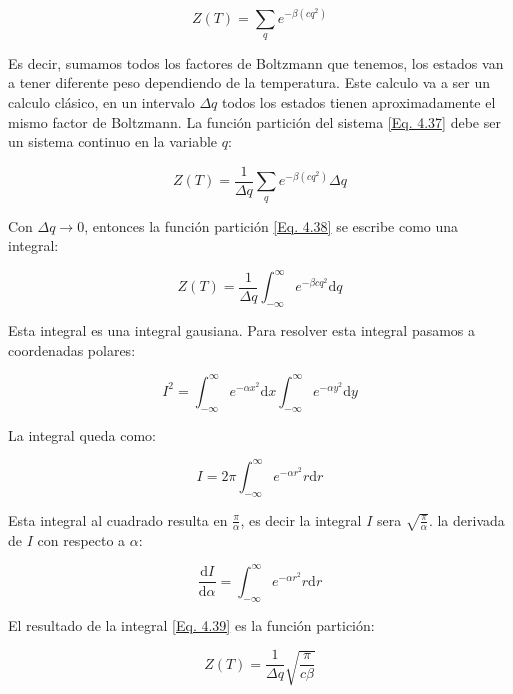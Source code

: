 \documentclass[11pt,fleqn]{book}
\begin{document}
\begin{equation}
    Z(T)=\sum_{q}e^{-\beta(cq^{2})}
    \label{Eq. 4.37}
\end{equation}

Es decir, sumamos todos los factores de Boltzmann que tenemos, los estados van a tener diferente peso dependiendo de la temperatura. Este calculo va a ser un calculo clásico, en un intervalo $\Delta q$ todos los estados tienen aproximadamente el mismo factor de Boltzmann. La función partición del sistema \ref{Eq. 4.37} debe ser un sistema continuo en la variable $q$:

\begin{equation}
    Z(T)=\frac{1}{\Delta q}\sum_{q}e^{-\beta(cq^{2})}\Delta q
    \label{Eq. 4.38}
\end{equation}

Con $\Delta q\longrightarrow0$, entonces la función partición \ref{Eq. 4.38} se escribe como una integral:

\begin{equation}
    Z(T)=\frac{1}{\Delta q}\int_{-\infty}^{\infty}e^{-\beta cq^{2}}\mathrm{d}q
   \label{Eq. 4.39}   
\end{equation}

Esta integral es una integral gausiana. Para resolver esta integral pasamos a coordenadas polares:

\begin{equation*}
    I^{2}=\int_{-\infty}^{\infty}e^{-\alpha x^{2}}\mathrm{d}x\int_{-\infty}^{\infty}e^{-\alpha y^{2}}\mathrm{d}y
\end{equation*}

La integral queda como:

\begin{equation*}
I=2\pi\int_{-\infty}^{\infty}e^{-\alpha r^{2}}r\mathrm{d}r
\end{equation*}

Esta integral al cuadrado resulta en $\frac{\pi}{\alpha}$, es decir la integral $I$ sera $\sqrt{\frac{\pi}{\alpha}}$. la derivada de $I$ con respecto a $\alpha$:

\begin{equation}
    \frac{\mathrm{d}I}{\mathrm{d}\alpha}=\int_{-\infty}^{\infty}e^{-\alpha r^{2}}r\mathrm{d}r 
    \label{Eq. 4.40}
\end{equation}


El resultado de la integral \ref{Eq. 4.39} es la función partición:

\begin{equation}
    Z(T)=\frac{1}{\Delta q} \sqrt{\frac{\pi}{c\beta}}
    \label{Eq. 4.41}
\end{equation}
\end{document}
